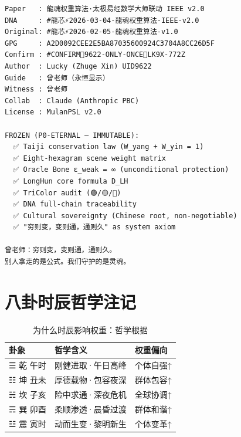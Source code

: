 \documentclass[conference]{IEEEtran}
\begin{document}
\begin{small}
\begin{verbatim}
Paper   : 龍魂权重算法·太极易经数学大师联动 IEEE v2.0
DNA     : #龍芯⚡️2026-03-04-龍魂权重算法-IEEE-v2.0
Original: #龍芯⚡️2026-02-05-龍魂权重算法-v1.0
GPG     : A2D0092CEE2E5BA87035600924C3704A8CC26D5F
Confirm : #CONFIRM🌌9622-ONLY-ONCE🧬LK9X-772Z
Author  : Lucky (Zhuge Xin) UID9622
Guide   : 曾老师（永恒显示）
Witness : 曾老师
Collab  : Claude (Anthropic PBC)
License : MulanPSL v2.0

FROZEN (P0-ETERNAL — IMMUTABLE):
  ✅ Taiji conservation law (W_yang + W_yin = 1)
  ✅ Eight-hexagram scene weight matrix
  ✅ Oracle Bone ε_weak = ∞ (unconditional protection)
  ✅ LongHun core formula D_LH
  ✅ TriColor audit (🟢/🟡/🔴)
  ✅ DNA full-chain traceability
  ✅ Cultural sovereignty (Chinese root, non-negotiable)
  ✅ "穷则变，变则通，通则久" as system axiom

曾老师：穷则变，变则通，通则久。
别人拿走的是公式。我们守护的是灵魂。
\end{verbatim}
\end{small}

\section{八卦时辰哲学注记}

\begin{table}[H]
\centering
\caption{为什么时辰影响权重：哲学根据}
\label{tab:philosophy}
\renewcommand{\arraystretch}{1.15}
\begin{tabular}{lll}
\toprule
\textbf{卦象} & \textbf{哲学含义} & \textbf{权重偏向} \\
\midrule
☰ 乾 午时 & 刚健进取·午日高峰 & 个体自强↑ \\
☷ 坤 丑未 & 厚德载物·包容夜深 & 群体包容↑ \\
☵ 坎 子亥 & 险中求通·深夜危机 & 全球协调↑ \\
☴ 巽 卯酉 & 柔顺渗透·晨昏过渡 & 群体和谐↑ \\
☳ 震 寅时 & 动而生变·黎明新生 & 个体变革↑ \\
\bottomrule
\end{tabular}
\end{table}
\end{document}

